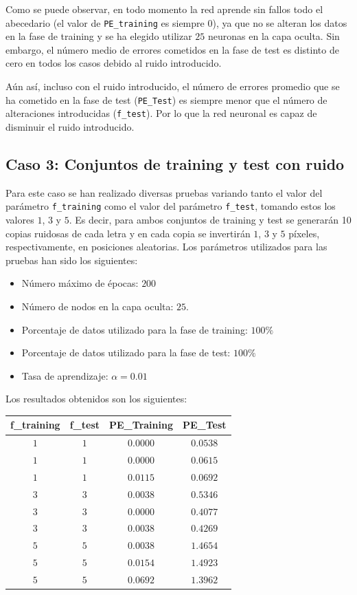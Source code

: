 \documentclass[spanish]{assignment}
\begin{document}
	Como se puede observar, en todo momento la red aprende sin fallos todo el abecedario (el valor de \texttt{PE\_training} es siempre $0$), ya que no se alteran los datos en la fase de training y se ha elegido utilizar $25$ neuronas en la capa oculta. Sin embargo, el número medio de errores cometidos en la fase de test es distinto de cero en todos los casos debido al ruido introducido. 
	
	Aún así, incluso con el ruido introducido, el número de errores promedio que se ha cometido en la fase de test (\texttt{PE\_Test}) es siempre menor que el número de alteraciones introducidas (\texttt{f\_test}). Por lo que la red neuronal es capaz de disminuir el ruido introducido.
	
	\subsection{Caso 3: Conjuntos de training y test con ruido}
	Para este caso se han realizado diversas pruebas variando tanto el valor del parámetro \texttt{f\_training} como el valor del parámetro \texttt{f\_test}, tomando estos los valores $1$, $3$ y $5$. Es decir, para ambos conjuntos de training y test se generarán 10 copias ruidosas de cada letra y en cada copia se invertirán $1$, $3$ y $5$ píxeles, respectivamente, en posiciones aleatorias.
	Los parámetros utilizados para las pruebas han sido los siguientes:
	\begin{itemize}
		\item Número máximo de épocas: $200$
		\item Número de nodos en la capa oculta: $25$.
		\item Porcentaje de datos utilizado para la fase de training: $100\%$
		\item Porcentaje de datos utilizado para la fase de test: $100\%$
		\item Tasa de aprendizaje: $\alpha = 0.01$
	\end{itemize}
	
	\newpage
	Los resultados obtenidos son los siguientes:
	\begin{center}
		\begin{tabular}{|c|c|c|c|}
		\hline
		\textbf{f\_training} & \textbf{f\_test} & \textbf{PE\_Training} & \textbf{PE\_Test} \\ 
		\hline
		$1$ & $1$ & $0.0000$ & $0.0538$\\
		$1$ & $1$ & $0.0000$ & $0.0615$\\
		$1$ & $1$ & $0.0115$ & $0.0692$\\
		\hline
		$3$ & $3$ & $0.0038$ & $0.5346$\\
		$3$ & $3$ & $0.0000$ & $0.4077$\\
		$3$ & $3$ & $0.0038$ & $0.4269$\\
		\hline
		$5$ & $5$ & $0.0038$ & $1.4654$\\
		$5$ & $5$ & $0.0154$ & $1.4923$\\
		$5$ & $5$ & $0.0692$ & $1.3962$\\
		\hline
		\end{tabular}
	\end{center}
	
\end{document}
